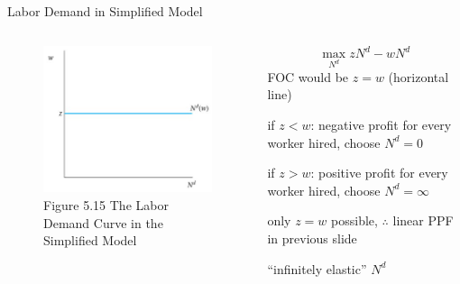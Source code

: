 \documentclass[11pt,aspectratio=169,usenames,dvipsnames]{beamer}
\let\tempone\itemize
\let\temptwo\enditemize
\renewenvironment{itemize}{\tempone\addtolength{\itemsep}{\fill}}{\temptwo}
\begin{document}
\begin{frame}{Labor Demand in Simplified Model}
\label{slide:Labor_Demand_in_Simplified_Model}
    \begin{columns}
        \begin{column}{0.5\textwidth}
            \begin{figure}
                \caption{\scriptsize Figure 5.15  The Labor Demand Curve in the Simplified Model}
                \includegraphics[width=\textwidth]{./figures/Figure_5_15.jpg}
            \end{figure}
        \end{column}
        \begin{column}{0.5\textwidth}
            \begin{equation*}
                 \max_{N^{d}} z N^{d} - wN^{d}
            \end{equation*}
            FOC would be $ z = w $ (horizontal line)
            \begin{itemize}
                \item if $ z < w $: negative profit for every worker hired, choose $ N^{d} = 0 $
                \item if $ z > w $: positive profit for every worker hired, choose $ N^{d} = \infty $
                \item only $ z = w $ possible, $ \therefore $ linear PPF in previous slide
                \begin{itemize}
                    \item ``infinitely elastic'' $ N^{d} $
                \end{itemize}
            \end{itemize}
        \end{column}
    \end{columns}
\end{frame}
\end{document}
